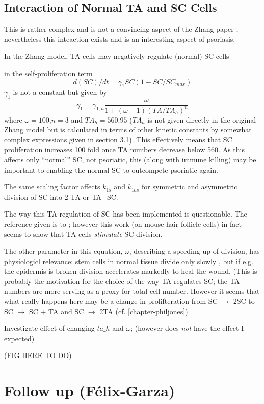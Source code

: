 \documentclass[a4paper,10pt]{report}
\begin{document}
\subsection{Interaction of Normal TA and SC Cells}\label{sec:intTASC}

This is rather complex and is not a convincing aspect of the Zhang paper
; nevertheless this inteaction exists and is an interesting aspect of 
psoriasis.


In the Zhang model,  TA cells may negatively regulate (normal) SC cells 

in the self-proliferation term 
\[
d(SC)/dt = \gamma_1 SC (1-SC/SC_{max})
\]
$\gamma_1$ is not a constant but given by 
\[
\gamma_1 = \gamma_{1,h} \frac{\omega}{1+(\omega-1)(TA/TA_h)^n}
\]
where $\omega=100$,$n=3$ and $TA_h=560.95$ ($TA_h$ is not given directly in the original Zhang model but is calculated in terms of other kinetic constants by somewhat complex expressions given in section 3.1). This effectively means that 
SC proliferation increases 100 fold once TA numbers decrease below 560. 
As this affects only ``normal'' SC, not psoriatic, this (along with immune killing) may be important to enabling the normal SC to outcompete psoriatic again.

The same scaling factor affects $k_{1s}$ and $k_{1as}$ for symmetric and asymmetric division of SC into 2 TA or TA+SC. 

The way this TA regulation of SC has been implemented is questionable. The reference given is to \cite{hsu2014transit}; however this work (on mouse hair follicle cells) in fact seems to show that TA cells {\em stimulate} SC division. 

The other parameter in this equation, $\omega$, describing a speeding-up of division, has physiologicl relevance: stem cells in normal tissue divide only slowly , but if e.g. the epidermis is broken division accelerates markedly to heal the wound. (This is probably the motivation for the choice of the way TA regulates SC; the TA numbers are more serving as a proxy for total cell number. However it seems that what really happens here may be a change in prolifteration from SC $\rightarrow$ 2SC to SC $\rightarrow$ SC + TA and SC $\rightarrow$ 2TA \cite{roshan2016human} (cf. \ref{chapter-philjones}). 

Investigate effect of changing $ta\_h$ and $\omega$; (however does {\em not} have the effect I expected)

(FIG HERE TO DO) 

\section{Follow up (F{\'e}lix-Garza)}
\end{document}
